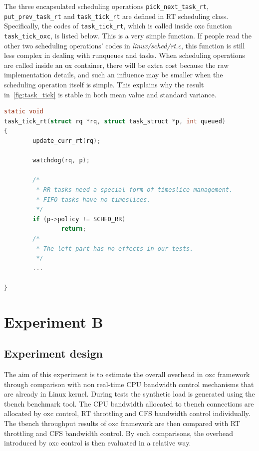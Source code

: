 The three encapsulated scheduling operations \texttt{pick\_next\_task\_rt}, 
\\\texttt{put\_prev\_task\_rt} and \texttt{task\_tick\_rt} are defined in
RT scheduling class. Specifically, the codes of \texttt{task\_tick\_rt},
which is called inside oxc function \texttt{task\_tick\_oxc}, is listed 
below. This is a very simple function. If people read the other two
scheduling operations' codes in \emph{linux/sched/rt.c}, this function is 
still less complex in dealing with runqueues and tasks. When scheduling 
operations are called inside an ox container, there will be extra cost 
because the raw implementation details, and such an influence may 
be smaller when the scheduling operation itself is simple. This explains 
why the result in~\ref{fig:task_tick} is stable in both mean value and 
standard variance.

\begin{lstlisting}[language=C,
			caption={The simple body of \texttt{task\_tick\_rt}},
			label={lst:task_tick_rt}]
static void 
task_tick_rt(struct rq *rq, struct task_struct *p, int queued)
{
        update_curr_rt(rq);

        watchdog(rq, p);

        /*
         * RR tasks need a special form of timeslice management.
         * FIFO tasks have no timeslices.
         */
        if (p->policy != SCHED_RR)
                return;
        /*
         * The left part has no effects in our tests.
         */
        ...

}
\end{lstlisting}

\section{Experiment B}

\subsection{Experiment design}

The aim of this experiment is to estimate the overall overhead in oxc 
framework through comparison with non real-time CPU bandwidth control 
mechanisms that are already in Linux kernel. During tests the synthetic 
load is generated using the tbench benchmark tool. The CPU bandwidth 
allocated to tbench connections are allocated by oxc control, RT 
throttling and CFS bandwidth control individually. The tbench throughput 
results of oxc framework are then compared with RT throttling and CFS 
bandwidth control. By such comparisons, the overhead introduced by oxc 
control is then evaluated in a relative way.

